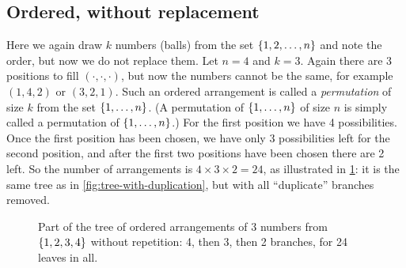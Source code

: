 \subsection{Ordered, without replacement}\label{sec:count-ordered-without}

Here we again draw $k$ numbers (balls) from the set $\left\{ 1, 2, \ldots, n \right\}$ and note the order, but now we do not replace them. Let $n = 4$ and $k = 3$. Again there are 3 positions to fill $(\cdot, \cdot, \cdot)$, but now the numbers cannot be the same, for example $(1, 4, 2)$ or $(3, 2, 1)$. Such an ordered arrangement is called a \emph{permutation} of size $k$ from the set $\left\{ 1, \ldots, n \right\}$. (A permutation of $\left\{ 1, \ldots, n \right\}$ of size $n$ is simply called a permutation of $\left\{ 1, \ldots, n \right\}$.) For the first position we have 4 possibilities. Once the first position has been chosen, we have only 3 possibilities left for the second position, and after the first two positions have been chosen there are 2 left. So the number of arrangements is $4 \times 3 \times 2 = 24$, as illustrated in \cref{fig:tree-without-duplication}: it is the same tree as in \cref{fig:tree-with-duplication}, but with all ``duplicate'' branches removed.

\begin{figure}[H]
\centering
{}
\caption{Part of the tree of ordered arrangements of 3 numbers from $\left\{ 1, 2, 3, 4 \right\}$ without repetition: 4, then 3, then 2 branches, for 24 leaves in all.}
\label{fig:tree-without-duplication}
\end{figure}

